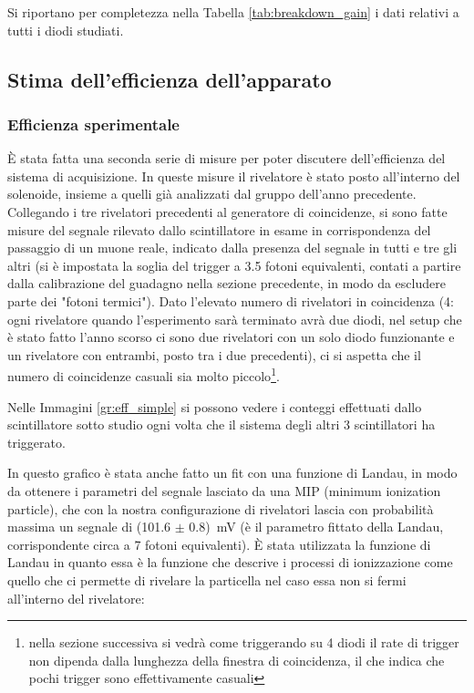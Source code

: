 Si riportano per completezza nella Tabella \ref{tab:breakdown_gain} i dati relativi a tutti i diodi studiati.


\subsection{Stima dell'efficienza dell'apparato}
\label{sec:efficiency}
\subsubsection{Efficienza sperimentale}
\`E stata fatta una seconda serie di misure per poter discutere dell'efficienza del sistema di acquisizione. In queste misure il rivelatore \`e stato posto all'interno del solenoide, insieme a quelli gi\`a analizzati dal gruppo dell'anno precedente. Collegando i tre rivelatori precedenti al generatore di coincidenze, si sono fatte misure del segnale rilevato dallo scintillatore in esame in corrispondenza del passaggio di un muone reale, indicato dalla presenza del segnale in tutti e tre gli altri (si è impostata la soglia del trigger a 3.5 fotoni equivalenti, contati a partire dalla calibrazione del guadagno nella sezione precedente, in modo da escludere parte dei "fotoni termici"). Dato l'elevato numero di rivelatori in coincidenza (4: ogni rivelatore quando l'esperimento sarà terminato avrà due diodi, nel setup che è stato fatto l'anno scorso ci sono due rivelatori con un solo diodo funzionante e un rivelatore con entrambi, posto tra i due precedenti), ci si aspetta che il numero di coincidenze casuali sia molto piccolo\footnote{nella sezione successiva si vedr\`a come triggerando su 4 diodi il rate di trigger non dipenda dalla lunghezza della finestra di coincidenza, il che indica che pochi trigger sono effettivamente casuali}.

Nelle Immagini \ref{gr:eff_simple} si possono vedere i conteggi effettuati dallo scintillatore sotto studio ogni volta che il sistema degli altri 3 scintillatori ha triggerato.


In questo grafico \`e stata anche fatto un fit con una funzione di Landau, in modo da ottenere i parametri del segnale lasciato da una MIP (minimum ionization particle), che con la nostra configurazione di rivelatori lascia con probabilit\`a massima un segnale di (101.6 $\pm$ 0.8)~mV (è il parametro fittato della Landau, corrispondente circa a 7 fotoni equivalenti). \`E stata utilizzata la funzione di Landau in quanto essa è la funzione che descrive i processi di ionizzazione come quello che ci permette di rivelare la particella nel caso essa non si fermi all'interno del rivelatore:

